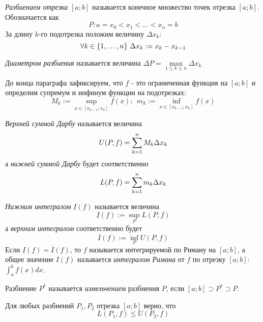 
\begin{definition}
	\textit{Разбиением отрезка} $[a; b]$ называется конечное множество точек отрезка $[a; b]$. Обозначается как
	\[
		P: a = x_0 < x_1 < \ldots < x_n = b
	\]
	За длину $k$-го подотрезка положим величину $\Delta x_k$:
	\[
		\forall k \in \{1, \ldots, n\}\ \Delta x_k := x_k - x_{k - 1}
	\]
\end{definition}

\begin{definition}
	\textit{Диаметром разбиения} называется величина $\Delta P = \max\limits_{1 \le k \le n} \Delta x_k$
\end{definition}

\begin{note}
	До конца параграфа зафиксируем, что $f$ - это ограниченная функция на $[a; b]$ и определим супремум и инфинум функции на подотрезках:
	\[
		M_k := \sup\limits_{x \in [x_{k - 1}; x_k]} f(x);\ \ m_k := \inf\limits_{x \in [x_{k - 1}; x_k]} f(x)
	\]
\end{note}


\begin{definition}
	\textit{Верхней суммой Дарбу} называется величина
	\[
		U(P, f) = \sum\limits_{k = 1}^n M_k \Delta x_k
	\]
	а \textit{нижней суммой Дарбу} будет соответственно
	\[
		L(P, f) = \sum\limits_{k = 1}^n m_k \Delta x_k
	\]
\end{definition}

\begin{definition}
	\textit{Нижним интегралом} $\underline{I}(f)$ называется величина
	\[
		\underline{I}(f) := \sup\limits_{P} L(P, f)
	\]
	а \textit{верхним интегралом} соответственно будет
	\[
		\overline{I}(f) := \inf\limits_{P} U(P, f)
	\]
	Если $\underline{I}(f) = \overline{I}(f)$, то $f$ называется интегрируемой по Риману на $[a; b]$, а общее значение $I(f)$ называется \textit{интегралом Римана} от $f$ по отрезку $[a; b]$: $\int_a^b f(x)dx$.
\end{definition}

\begin{definition}
	Разбиение $P^*$ называется \textit{измельчением} разбиения $P$, если $[a; b] \supset P^* \supset P$.
\end{definition}

\begin{lemma}
	Для любых разбиений $P_1, P_2$ отрезка $[a; b]$ верно, что
	\[
		L(P_1, f) \le U(P_2, f)
	\]
\end{lemma}

